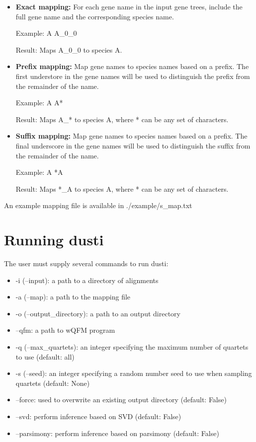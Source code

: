 \documentclass{scrartcl}
\begin{document}
\begin{itemize}

    \item \textbf{Exact mapping:} For each gene name in the input gene trees, include the full gene name and the corresponding species name.

    Example: A    A\_0\_0

    Result: Maps A\_0\_0 to species A.

    \item \textbf{Prefix mapping:} Map gene names to species names based on a prefix. The first understore in the gene names will be used to distinguish the prefix from the remainder of the name.
    
    Example: A    A*

    Result: Maps A\_* to species A, where * can be any set of characters.

    \item \textbf{Suffix mapping:} Map gene names to species names based on a prefix. The final underscore in the gene names will be used to distinguish the suffix from the remainder of the name.
    
    Example: A    *A

    Result: Maps *\_A to species A, where * can be any set of characters.

\end{itemize}

An example mapping file is available in ./example/s\_map.txt

\section{Running dusti}

The user must supply several commands to run dusti:

\begin{itemize}
    \item -i (--input): a path to a directory of alignments
    \item -a (--map): a path to the mapping file
    \item -o (--output\_directory): a path to an output directory
    \item --qfm: a path to wQFM program
    \item -q (--max\_quartets): an integer specifying the maximum number of quartets to use (default: all)
    \item -s (--seed): an integer specifying a random number seed to use when sampling quartets (default: None)
    \item --force: used to overwrite an existing output directory (default: False)
    \item --svd: perform inference based on SVD (default: False)
    \item --parsimony: perform inference based on parsimony (default: False)
\end{itemize}
\end{document}
